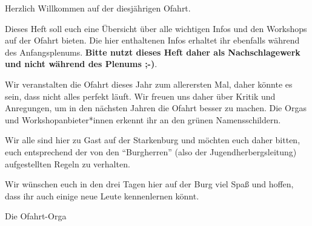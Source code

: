 
Herzlich Willkommen auf der diesjährigen Ofahrt.

\vspace{3mm}

Dieses Heft soll euch eine Übersicht über alle wichtigen Infos und den Workshops auf der Ofahrt bieten. Die hier enthaltenen Infos erhaltet ihr ebenfalls während des Anfangsplenums. \textbf{Bitte nutzt dieses Heft daher als Nachschlagewerk und nicht während des Plenums ;-)}. 

\vspace{3mm}

Wir veranstalten die Ofahrt dieses Jahr zum allerersten Mal, daher könnte es sein, dass nicht alles perfekt läuft. Wir freuen uns daher über Kritik und Anregungen, um in den nächsten Jahren die Ofahrt besser zu machen. Die Orgas und Workshopanbieter*innen erkennt ihr an den grünen Namensschildern.

\vspace{3mm}

Wir alle sind hier zu Gast auf der Starkenburg und möchten euch daher bitten, euch entsprechend der von den "`Burgherren"' (also der Jugendherbergsleitung) aufgestellten Regeln zu verhalten. 

\vspace{3mm}

Wir wünschen euch in den drei Tagen hier auf der Burg viel Spaß und hoffen, dass ihr auch einige neue Leute kennenlernen könnt.

\vspace{5mm}

Die Ofahrt-Orga


\newpage